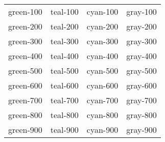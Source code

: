 \documentclass{article}
\begin{document}
\begin{tabular}{ |c|c|c|c| } 
    \hline
    \cellcolor{green-100} green-100 & \cellcolor{teal-100} teal-100 & \cellcolor{cyan-100} cyan-100 & \cellcolor{gray-100} gray-100 \\ 
    \cellcolor{green-200} green-200 & \cellcolor{teal-200} teal-200 & \cellcolor{cyan-200} cyan-200 & \cellcolor{gray-200} gray-200 \\ 
    \cellcolor{green-300} green-300 & \cellcolor{teal-300} teal-300 & \cellcolor{cyan-300} cyan-300 & \cellcolor{gray-300} gray-300 \\ 
    \cellcolor{green-400} green-400 & \cellcolor{teal-400} teal-400 & \cellcolor{cyan-400} cyan-400 & \cellcolor{gray-400} gray-400 \\ 
    \cellcolor{green-500} green-500 & \cellcolor{teal-500} teal-500 & \cellcolor{cyan-500} cyan-500 & \cellcolor{gray-500} gray-500 \\ 
    \cellcolor{green-600} green-600 & \cellcolor{teal-600} teal-600 & \cellcolor{cyan-600} cyan-600 & \cellcolor{gray-600} gray-600 \\ 
    \cellcolor{green-700}\color{white} green-700 & \cellcolor{teal-700}\color{white} teal-700 & \cellcolor{cyan-700}\color{white} cyan-700 & \cellcolor{gray-700}\color{white} gray-700 \\ 
    \cellcolor{green-800}\color{white} green-800 & \cellcolor{teal-800}\color{white} teal-800 & \cellcolor{cyan-800}\color{white} cyan-800 & \cellcolor{gray-800}\color{white} gray-800 \\ 
    \cellcolor{green-900}\color{white} green-900 & \cellcolor{teal-900}\color{white} teal-900 & \cellcolor{cyan-900}\color{white} cyan-900 & \cellcolor{gray-900}\color{white} gray-900 \\ 
    \hline
\end{tabular}
\end{document}
